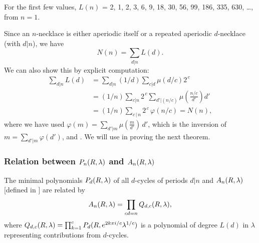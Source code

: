 \documentclass[twocolumn]{revtex4-1}
\begin{document}
For the first few values,
$L(n)$ =
2, 1, 2, 3, 6, 9, 18, 30, 56, 99, 186, 335, 630, \ldots,
from $n = 1$.



Since an $n$-necklace is either aperiodic itself or
  a repeated aperiodic $d$-necklace (with $d|n$),
  we have
\begin{equation}
N(n) = \sum_{d|n} L(d).
\label{eq:necklacelyndon}
\end{equation}
%
We can also show this by explicit computation:
\begin{align*}
\sum_{d | n} L(d)
  &= \sum_{d | n} (1/d) \sum_{c |  d} \mu(d/c) 2^{\,c} \\
  &= (1/n) \sum_{c | n} 2^{\,c} \sum_{d'  |  (n/c)}
        \mu\left(\frac{n/c}{d'}\right) d' \\
  &= (1/n) \sum_{c \, | \, n} 2^{\,c} \, \varphi(n/c)
  = N(n),
\end{align*}
where we have used $\varphi(m) = \sum_{d' | m} \mu(\frac{m}{d'}) \, d'$,
which is the inversion of $m = \sum_{d' | m} \varphi(d')$,
and .
%
We will use  in proving the next theorem.



\subsubsection{Relation between $P_n(R, \lambda)$ and $A_n(R, \lambda)$}



\begin{theorem}
The minimal polynomials $P_d(R, \lambda)$ of all $d$-cycles
  of periods $d|n$
and $A_n(R, \lambda)$ [defined in ] are related by
  \begin{equation}
    A_n(R, \lambda) = \prod_{cd = n} Q_{d, c}(R, \lambda),
    \label{eq:prod}
  \end{equation}
  where
  $Q_{d,c}(R, \lambda) = \prod_{k=1}^{c} P_d(R, e^{2 k \pi i/c} \lambda^{1/c})$
  is a polynomial of degree $L(d)$ in $\lambda$
  representing contributions from $d$-cycles.
\label{thm:prod}
\end{theorem}
\end{document}
